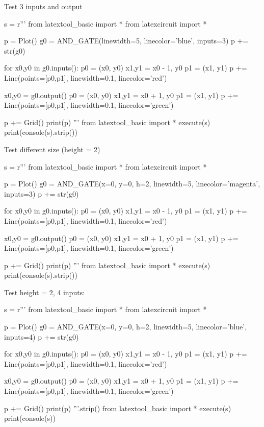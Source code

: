 Test 3 inputs and output
\begin{python}
s = r'''
from latextool_basic import *
from latexcircuit import *

p = Plot()
g0 = AND_GATE(linewidth=5, linecolor='blue', inputs=3)
p += str(g0)

for x0,y0 in g0.inputs():
    p0 = (x0, y0)
    x1,y1 = x0 - 1, y0
    p1 = (x1, y1)
    p += Line(points=[p0,p1], linewidth=0.1, linecolor='red')

x0,y0 = g0.output()
p0 = (x0, y0)
x1,y1 = x0 + 1, y0
p1 = (x1, y1)
p += Line(points=[p0,p1], linewidth=0.1, linecolor='green')

p += Grid()
print(p)
'''
from latextool_basic import *
execute(s)
print(console(s).strip())
\end{python}
  





Test different size (height = 2)
\begin{python}
s = r'''
from latextool_basic import *
from latexcircuit import *

p = Plot()
g0 = AND_GATE(x=0, y=0, h=2,
              linewidth=5, linecolor='magenta', inputs=3)
p += str(g0)

for x0,y0 in g0.inputs():
    p0 = (x0, y0)
    x1,y1 = x0 - 1, y0
    p1 = (x1, y1)
    p += Line(points=[p0,p1], linewidth=0.1, linecolor='red')

x0,y0 = g0.output()
p0 = (x0, y0)
x1,y1 = x0 + 1, y0
p1 = (x1, y1)
p += Line(points=[p0,p1], linewidth=0.1, linecolor='green')

p += Grid()
print(p)
'''
from latextool_basic import *
execute(s)
print(console(s).strip())
\end{python}





Test height = 2, 4 inputs:
\begin{python}
s = r'''
from latextool_basic import *
from latexcircuit import *

p = Plot()
g0 = AND_GATE(x=0, y=0, h=2,
              linewidth=5, linecolor='blue', inputs=4)
p += str(g0)

for x0,y0 in g0.inputs():
    p0 = (x0, y0)
    x1,y1 = x0 - 1, y0
    p1 = (x1, y1)
    p += Line(points=[p0,p1], linewidth=0.1, linecolor='red')

x0,y0 = g0.output()
p0 = (x0, y0)
x1,y1 = x0 + 1, y0
p1 = (x1, y1)
p += Line(points=[p0,p1], linewidth=0.1, linecolor='green')

p += Grid()
print(p)
'''.strip()
from latextool_basic import *
execute(s)
print(console(s))
\end{python}


